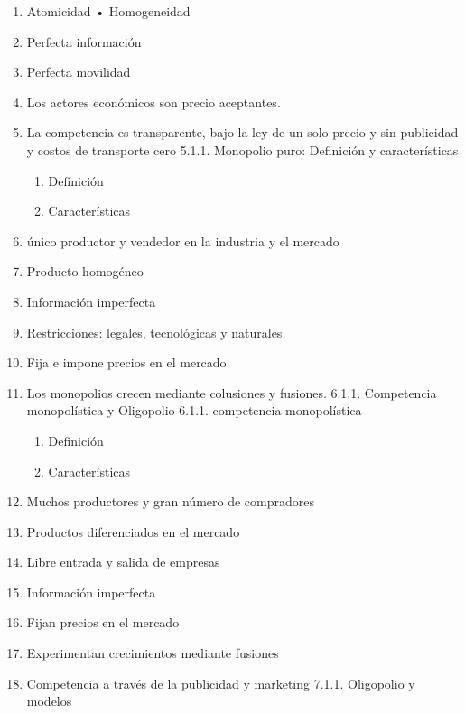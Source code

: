 \documentclass[
  jou,
  floatsintext,
  longtable,
  a4paper,
  nolmodern,
  notxfonts,
  notimes,
  12pt,
  colorlinks=true,linkcolor=blue,citecolor=blue,urlcolor=blue]{apa7}
\providecommand{\tightlist}{%
  \setlength{\itemsep}{0pt}\setlength{\parskip}{0pt}}
\begin{document}
\begin{enumerate}
\def\labelenumi{\arabic{enumi}.}
\tightlist
\item
  Atomicidad • Homogeneidad
\item
  Perfecta información
\item
  Perfecta movilidad
\item
  Los actores económicos son precio aceptantes.
\item
  La competencia es transparente, bajo la ley de un solo precio y sin
  publicidad y costos de transporte cero 5.1.1. Monopolio puro:
  Definición y características

  \begin{enumerate}
  \def\labelenumii{\Alph{enumii})}
  \tightlist
  \item
    Definición
  \item
    Características
  \end{enumerate}
\item
  único productor y vendedor en la industria y el mercado
\item
  Producto homogéneo
\item
  Información imperfecta
\item
  Restricciones: legales, tecnológicas y naturales
\item
  Fija e impone precios en el mercado
\item
  Los monopolios crecen mediante colusiones y fusiones. 6.1.1.
  Competencia monopolística y Oligopolio 6.1.1. competencia
  monopolística

  \begin{enumerate}
  \def\labelenumii{\Alph{enumii})}
  \tightlist
  \item
    Definición
  \item
    Características
  \end{enumerate}
\item
  Muchos productores y gran número de compradores
\item
  Productos diferenciados en el mercado
\item
  Libre entrada y salida de empresas
\item
  Información imperfecta
\item
  Fijan precios en el mercado
\item
  Experimentan crecimientos mediante fusiones
\item
  Competencia a través de la publicidad y marketing 7.1.1. Oligopolio y
  modelos


\end{enumerate}
\end{document}
